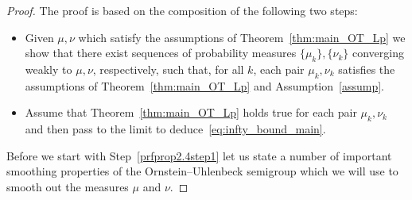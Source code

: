 \documentclass[AHL,Unicode,longabstracts]{cedram}
\newcommand{\source}{\mu}
\newcommand{\target}{\nu}
\newcounter{setofstep}
\newcounter{step}[setofstep]
\begin{document}
\begin{proof}
The proof is based on the composition of the following two steps:
\begin{itemize}%
\item[Step~\ref{prfprop2.4step1}:] Given $\source,\target$ which satisfy the assumptions of Theorem~\ref{thm:main_OT_Lp} we show that there exist sequences of probability measures $\{\source_k\},\{\target_k\}$ converging weakly to $\source,\target$, respectively, such that, for all $k$, each pair $\source_k,\target_k$ satisfies the assumptions of Theorem~\ref{thm:main_OT_Lp} and Assumption~\ref{assump}.

\item[Step~\ref{prfprop2.4step2}:] Assume that Theorem~\ref{thm:main_OT_Lp} holds true for each pair $\source_k,\target_k$ and then pass to the limit to deduce~\eqref{eq:infty_bound_main}.
\end{itemize}

Before we start with Step~\ref{prfprop2.4step1} let us state a number of important smoothing properties of the Ornstein--Uhlenbeck semigroup which we will use to smooth out the measures $\source$ and $\target$.



\end{proof}
\end{document}
